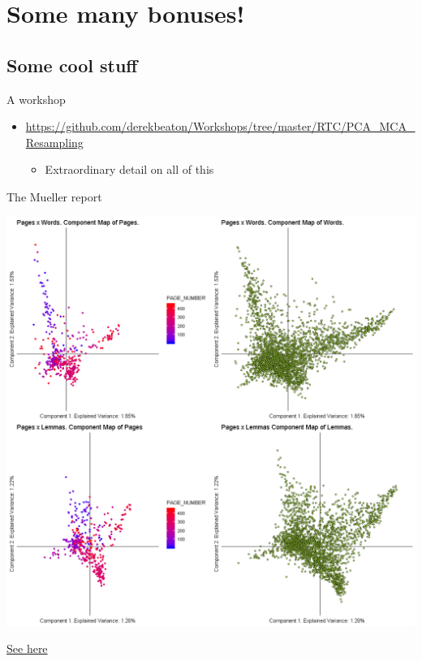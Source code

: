 \documentclass[
  ignorenonframetext,
]{beamer}
\providecommand{\tightlist}{%
  \setlength{\itemsep}{0pt}\setlength{\parskip}{0pt}}
\begin{document}
\hypertarget{some-many-bonuses}{%
\section{Some many bonuses!}\label{some-many-bonuses}}

\hypertarget{some-cool-stuff}{%
\subsection{Some cool stuff}\label{some-cool-stuff}}

\begin{frame}{A workshop}
\protect\hypertarget{a-workshop}{}

\begin{itemize}[<+->]
\tightlist
\item
  \url{https://github.com/derekbeaton/Workshops/tree/master/RTC/PCA_MCA_Resampling}

  \begin{itemize}[<+->]
  \tightlist
  \item
    Extraordinary detail on all of this
  \end{itemize}
\end{itemize}

\end{frame}

\begin{frame}{The Mueller report}
\protect\hypertarget{the-mueller-report}{}

\end{frame}

\begin{frame}

\includegraphics{../images/vis_components-1.png}

\href{https://github.com/derekbeaton/muellerreport_ca}{See here}

\end{frame}
\end{document}
